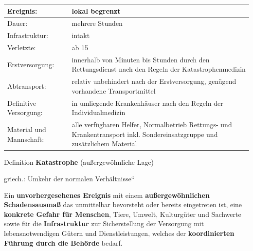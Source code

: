 \documentclass{article}
\newcommand\gEs[1]{\textbf{\textcolor[rgb]{0.0,0.0,0.5019608}{#1}}}
\newcommand\gEs[1]{\textbf{\textcolor[rgb]{0.0,0.0,0.5019608}{#1}}}
\newcommand\gT[1]{\textbf{\textup{\textcolor[rgb]{0.0,0.5019608,0.0}{#1}}}}
\newcommand\gZ[1]{\textcolor[rgb]{0.5019608,0.5019608,0.5019608}{#1}}
\begin{document}
\begin{center}
\begin{tabular}{|m{3.31cm}|m{9.99cm}|}
\hline
{\mdseries Ereignis:}

 &
{\mdseries lokal begrenzt}

\\\hline
{\mdseries Dauer:}

 &
{\mdseries mehrere Stunden}

\\\hline
{\mdseries Infrastruktur:}

 &
{\mdseries intakt}

\\\hline
{\mdseries Verletzte:}

 &
{\mdseries ab 15}

\\\hline
{\mdseries Erstversorgung:}

 &
{\mdseries innerhalb von Minuten bis Stunden durch den Rettungsdienst
nach den Regeln der Katastrophenmedizin}

\\\hline
{\mdseries Abtransport:}

 &
{\mdseries relativ unbehindert nach der Erstversorgung, gen\"ugend
vorhandene Transportmittel}

\\\hline
{\mdseries Definitive Versorgung:}

 &
{\mdseries in umliegende Krankenh\"auser nach den Regeln der
Individualmedizin}

\\\hline
{\mdseries Material und Mannschaft:}

 &
{\mdseries alle verf\"ugbaren Helfer, Normalbetrieb Rettungs- und
Krankentransport inkl. Sondereinsatzgruppe und zus\"atzlichem Material}

\\\hline
\end{tabular}
\end{center}
{\mdseries\color{black}
Definition \gT{Katastrophe}
(au{\ss}ergew\"ohnliche Lage)}

{\mdseries
griech.:  {\quotedblbase}Umkehr der normalen
Verh\"altnisse{\textquotedblleft} }

{\mdseries
Ein \gEs{unvorhergesehenes Ereignis} mit einem
\gEs{au{\ss}ergew\"ohnlichen Schadensausma{\ss}}
das unmittelbar bevorsteht oder bereits eingetreten ist, eine
\gEs{konkrete Gefahr f\"ur Menschen},
\gZ{Tiere, Umwelt, Kulturg\"uter und Sachwerte} sowie
f\"ur die \gEs{Infrastruktur} zur Sicherstellung
der Versorgung mit lebensnotwendigen G\"utern und Dienstleistungen,
welches der \gEs{koordinierten F\"uhrung durch die
Beh\"orde} bedarf. }
\end{document}

